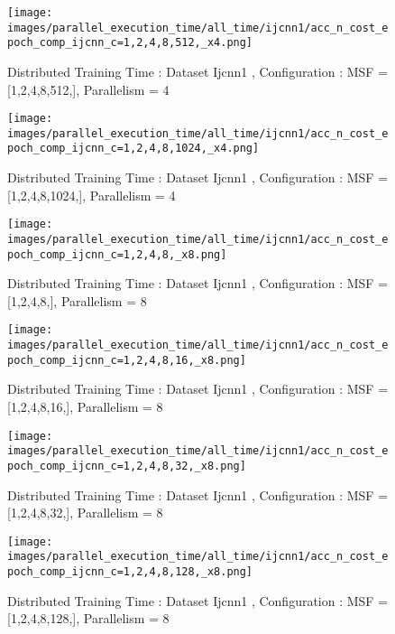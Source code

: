 \begin{figure*}[htbp]
\centering
\texttt{[image: images/parallel\_execution\_time/all\_time/ijcnn1/acc\_n\_cost\_epoch\_comp\_ijcnn\_c=1,2,4,8,512,\_x4.png]}
\caption{Distributed Training Time : Dataset Ijcnn1 , Configuration : MSF = [1,2,4,8,512,], Parallelism = 4}
\label{fig:dis-msf-tr-time-ijcnn1-x4}
\end{figure*}


\begin{figure*}[htbp]
\centering
\texttt{[image: images/parallel\_execution\_time/all\_time/ijcnn1/acc\_n\_cost\_epoch\_comp\_ijcnn\_c=1,2,4,8,1024,\_x4.png]}
\caption{Distributed Training Time : Dataset Ijcnn1 , Configuration : MSF = [1,2,4,8,1024,], Parallelism = 4}
\label{fig:dis-msf-tr-time-ijcnn1-x4}
\end{figure*}


\begin{figure*}[htbp]
\centering
\texttt{[image: images/parallel\_execution\_time/all\_time/ijcnn1/acc\_n\_cost\_epoch\_comp\_ijcnn\_c=1,2,4,8,\_x8.png]}
\caption{Distributed Training Time : Dataset Ijcnn1 , Configuration : MSF = [1,2,4,8,], Parallelism = 8}
\label{fig:dis-msf-tr-time-ijcnn1-x8}
\end{figure*}


\begin{figure*}[htbp]
\centering
\texttt{[image: images/parallel\_execution\_time/all\_time/ijcnn1/acc\_n\_cost\_epoch\_comp\_ijcnn\_c=1,2,4,8,16,\_x8.png]}
\caption{Distributed Training Time : Dataset Ijcnn1 , Configuration : MSF = [1,2,4,8,16,], Parallelism = 8}
\label{fig:dis-msf-tr-time-ijcnn1-x8}
\end{figure*}


\begin{figure*}[htbp]
\centering
\texttt{[image: images/parallel\_execution\_time/all\_time/ijcnn1/acc\_n\_cost\_epoch\_comp\_ijcnn\_c=1,2,4,8,32,\_x8.png]}
\caption{Distributed Training Time : Dataset Ijcnn1 , Configuration : MSF = [1,2,4,8,32,], Parallelism = 8}
\label{fig:dis-msf-tr-time-ijcnn1-x8}
\end{figure*}


\begin{figure*}[htbp]
\centering
\texttt{[image: images/parallel\_execution\_time/all\_time/ijcnn1/acc\_n\_cost\_epoch\_comp\_ijcnn\_c=1,2,4,8,128,\_x8.png]}
\caption{Distributed Training Time : Dataset Ijcnn1 , Configuration : MSF = [1,2,4,8,128,], Parallelism = 8}
\label{fig:dis-msf-tr-time-ijcnn1-x8}
\end{figure*}


